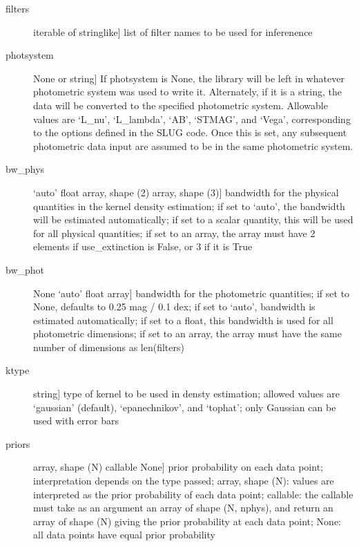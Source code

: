 \documentclass[letterpaper,10pt,english]{sphinxmanual}
\begin{document}
\begin{fulllineitems}
\begin{fulllineitems}
\begin{description}
\begin{description}
\item[{filters}] \leavevmode{[}iterable of stringlike{]}
list of filter names to be used for inferenence

\item[{photsystem}] \leavevmode{[}None or string{]}
If photsystem is None, the library will be left in
whatever photometric system was used to write
it. Alternately, if it is a string, the data will be
converted to the specified photometric system. Allowable
values are `L\_nu', `L\_lambda', `AB', `STMAG', and
`Vega', corresponding to the options defined in the SLUG
code. Once this is set, any subsequent photometric data
input are assumed to be in the same photometric system.

\item[{bw\_phys}] \leavevmode{[}`auto' \textbar{} float \textbar{} array, shape (2) \textbar{} array, shape (3){]}
bandwidth for the physical quantities in the kernel
density estimation; if set to `auto', the bandwidth will
be estimated automatically; if set to a scalar quantity,
this will be used for all physical quantities; if set to
an array, the array must have 2 elements if
use\_extinction is False, or 3 if it is True

\item[{bw\_phot}] \leavevmode{[}None \textbar{} `auto' \textbar{} float \textbar{} array{]}
bandwidth for the photometric quantities; if set to
None, defaults to 0.25 mag / 0.1 dex; if set to `auto',
bandwidth is estimated automatically; if set to a float,
this bandwidth is used for all photometric dimensions;
if set to an array, the array must have the same number
of dimensions as len(filters)

\item[{ktype}] \leavevmode{[}string{]}
type of kernel to be used in densty estimation; allowed
values are `gaussian' (default), `epanechnikov', and
`tophat'; only Gaussian can be used with error bars

\item[{priors}] \leavevmode{[}array, shape (N) \textbar{} callable \textbar{} None{]}
prior probability on each data point; interpretation
depends on the type passed; array, shape (N): values are
interpreted as the prior probability of each data point;
callable: the callable must take as an argument an array
of shape (N, nphys), and return an array of shape (N)
giving the prior probability at each data point; None:
all data points have equal prior probability


\end{description}
\end{description}
\end{fulllineitems}
\end{fulllineitems}
\end{document}
